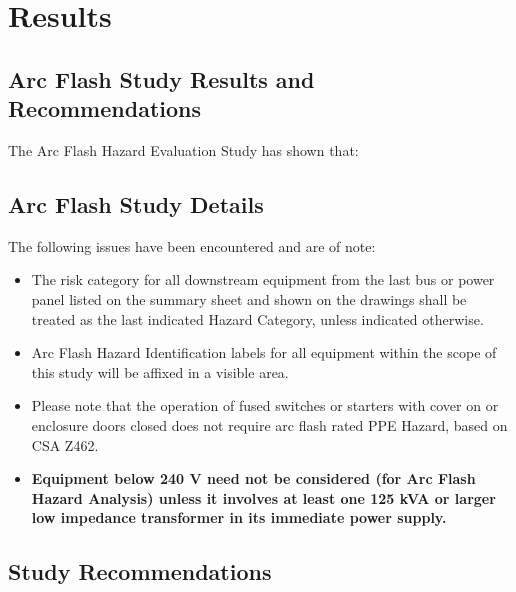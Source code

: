 
\section{Results}
\label{af:results}

\subsection{Arc Flash Study Results and Recommendations}
\label{af:results:afrr}

The Arc Flash Hazard Evaluation Study has shown that:

\pagebreak

\subsection{Arc Flash Study Details}
\label{af:results:afsd}

The following issues have been encountered and are of note:

\begin{itemize} 
\item The risk category for all downstream equipment from the last bus or power panel listed on the summary sheet and shown on the drawings shall be treated as the last indicated Hazard Category, unless indicated otherwise.

\item Arc Flash Hazard Identification labels for all equipment within the scope of this study will be affixed in a visible area.

\item Please note that the operation of fused switches or starters with cover on or enclosure doors closed does not require arc flash rated PPE Hazard, based on CSA Z462.

\item\textbf{Equipment below 240 V need not be considered (for Arc Flash Hazard Analysis) unless it involves at least one 125 kVA or larger low impedance transformer in its immediate power supply.}\cite{IEEE}	 
\end{itemize}
\pagebreak
\subsection{Study Recommendations}
\label{af:results:afsr}

